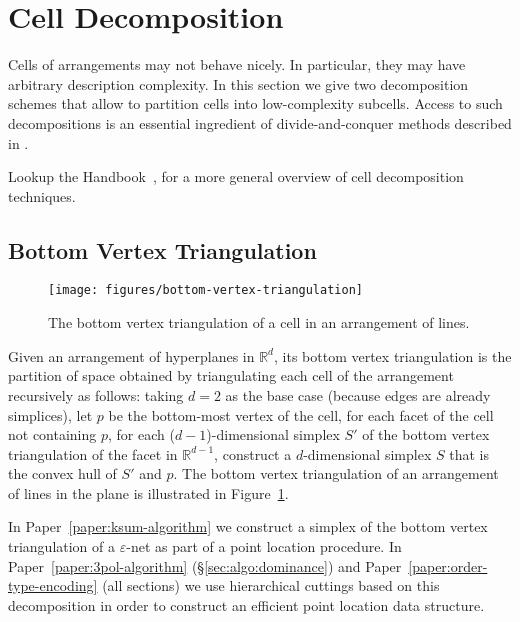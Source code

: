 \section{Cell Decomposition}%
\label{sec:arrangements:cell-decomposition}

Cells of arrangements may not behave nicely. In particular, they may have
arbitrary description complexity.
%
In this section we give two decomposition schemes that allow to partition cells
into low-complexity subcells.
%
Access to such decompositions is an essential ingredient of divide-and-conquer
methods described in .

Lookup the Handbook~\cite[\S{}24.3.2]{Hal04},
for a more general overview of cell decomposition techniques.

\subsection{Bottom Vertex Triangulation}%
\label{sec:arrangements:triangulation}

\begin{figure}
  \centering{}
  \texttt{[image: figures/bottom-vertex-triangulation]}
  \caption{%
    The bottom vertex triangulation of a cell in an arrangement of lines.%
  }%
  \label{fig:bvt}
\end{figure}

Given an arrangement of hyperplanes in \(\mathbb{R}^d\), its bottom vertex
triangulation is the partition of space obtained by triangulating each cell of
the arrangement recursively as follows: taking \(d=2\) as the base case
(because edges are already simplices),
let \(p\) be the bottom-most vertex of the cell,
for each facet of the cell not containing \(p\),
for each (\(d-1\))-dimensional simplex \(S'\) of the bottom vertex triangulation
of the facet in \(\mathbb{R}^{d-1}\),
construct a \(d\)-dimensional simplex \(S\) that is the convex hull of
\(S'\) and \(p\).
%
The
bottom vertex triangulation of an arrangement of lines in the plane is illustrated
in Figure~\ref{fig:bvt}.

In Paper~\ref{paper:ksum-algorithm} we construct a simplex of the bottom vertex
triangulation of a \(\varepsilon\)-net as part of a point location procedure.
%
In Paper~\ref{paper:3pol-algorithm} (\S\ref{sec:algo:dominance})
and Paper~\ref{paper:order-type-encoding} (all sections)
we use hierarchical cuttings based on this decomposition in order to construct
an efficient point location data structure.

